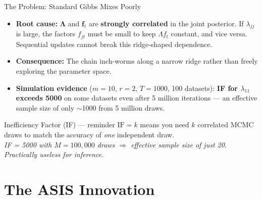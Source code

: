 \documentclass[10pt]{beamer}\usepackage[]{graphicx}\usepackage[table]{xcolor}
\begin{document}
\begin{frame}{The Problem: Standard Gibbs Mixes Poorly}

  \begin{itemize}
    \setlength\itemsep{0.7em}

    \item \textbf{Root cause:} $\boldsymbol{\Lambda}$ and $\mathbf{f}_t$
    are \textbf{strongly correlated} in the joint posterior.
    If $\lambda_{jj}$ is large, the factors $f_{jt}$ must be small to keep
    $\Lambda f_t$ constant, and vice versa.
    Sequential updates cannot break this ridge-shaped dependence.

    \item \textbf{Consequence:} The chain inch-worms along a narrow ridge
    rather than freely exploring the parameter space.

    \item \textbf{Simulation evidence} ($m=10$, $r=2$, $T=1000$, 100 datasets):
    \textbf{IF for $\lambda_{11}$ exceeds 5000} on some datasets even after
    5 million iterations --- an effective sample size of only $\sim$1000
    from 5 million draws.

  \end{itemize}

  \vspace{0.2em}

  \begin{block}{Inefficiency Factor (IF) --- reminder}
    $\mathrm{IF} = k$ means you need $k$ correlated MCMC draws to match the
    accuracy of \emph{one} independent draw.
    \\[0.3em]
    \textit{IF = 5000 with $M=100{,}000$ draws $\Rightarrow$
    effective sample size of just 20.  Practically useless for inference.}
  \end{block}

\end{frame}


\section{The ASIS Innovation}
\label{sec:asis}
\end{document}
